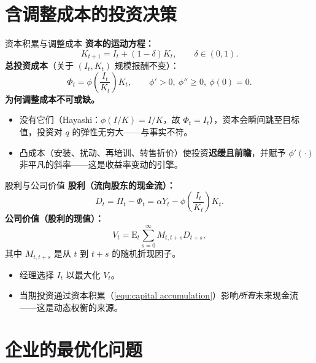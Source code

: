 \documentclass{beamer}
\begin{document}
\section{含调整成本的投资决策}

\begin{frame}{资本积累与调整成本}
	\textbf{资本的运动方程：}
	\begin{equation}\label{equ:capital accumulation}
		K_{t+1}=I_t+(1-\delta)K_t,\qquad \delta\in(0,1).
	\end{equation}
	\textbf{总投资成本}（关于 $(I_t,K_t)$ 规模报酬不变）：
	\begin{equation}\label{equ:investment cost}
		\Phi_t=\phi\!\left(\frac{I_t}{K_t}\right)K_t,\qquad \phi'>0,\ \phi''\ge 0,\ \phi(0)=0.
	\end{equation}
	\textbf{为何调整成本不可或缺。}
	\begin{itemize}
		\item 没有它们（Hayashi：$\phi(I/K)=I/K$，故 $\Phi_t=I_t$），资本会瞬间跳至目标值，投资对 $q$ 的弹性无穷大——与事实不符。
		\item 凸成本（安装、扰动、再培训、转售折价）使投资\textbf{迟缓且前瞻}，并赋予 $\phi'(\cdot)$ 非平凡的斜率——这是收益率变动的引擎。
	\end{itemize}
\end{frame}

\begin{frame}{股利与公司价值}
	\textbf{股利（流向股东的现金流）：}
	\begin{equation}\label{equ:dividend}
		D_t=\Pi_t-\Phi_t=\alpha Y_t-\phi\!\left(\frac{I_t}{K_t}\right)K_t.
	\end{equation}
	\textbf{公司价值（股利的现值）：}
	\begin{equation}\label{equ:firm value}
		V_t=\mathrm{E}_t\sum_{s=0}^{\infty}M_{t,t+s}D_{t+s},
	\end{equation}
	其中 $M_{t,t+s}$ 是从 $t$ 到 $t+s$ 的随机折现因子。
	\begin{itemize}
		\item 经理选择 $I_t$ 以最大化 $V_t$。
		\item 当期投资通过资本积累（\ref{equ:capital accumulation}）影响\textit{所有}未来现金流——这是动态权衡的来源。
	\end{itemize}
\end{frame}

\section{企业的最优化问题}
\end{document}
